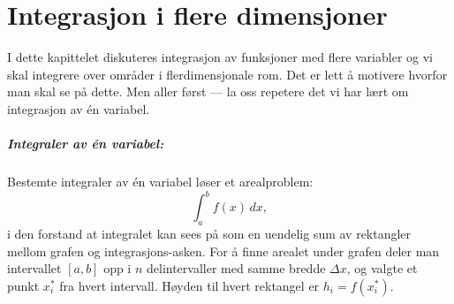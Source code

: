 \chapter{Integrasjon i flere dimensjoner}
\label{chap:Integrasjon}
I dette kapittelet diskuteres integrasjon av funksjoner med flere variabler og vi skal integrere over områder i flerdimensjonale rom. Det er lett å motivere hvorfor man skal se på dette. Men aller først — la oss repetere det vi har lært om integrasjon av én variabel.

\begin{minipage}{7cm}
\paragraph{Integraler av én variabel:} Bestemte integraler av én variabel løser et arealproblem:
\[
\int_a^b f(x) \, dx,
\]
i den forstand at integralet kan sees på som en uendelig sum av rektangler mellom grafen og integrasjons-asken. For å finne arealet under grafen deler man intervallet \( [a, b] \) opp i \( n \) delintervaller med samme bredde \( \Delta x \), og valgte et punkt \( x_i^* \) fra hvert intervall.
Høyden til hvert rektangel er \( h_i=f(x_i^*) \).
\end{minipage}
\begin{minipage}{6cm}
\end{minipage}

